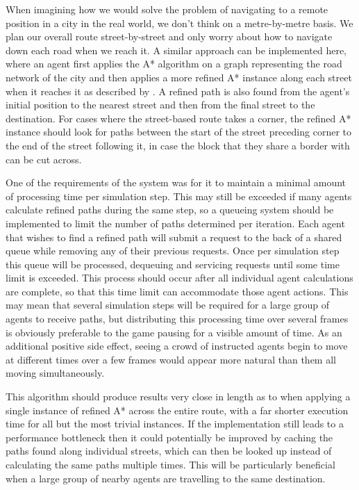 \documentclass[12pt,a4paper]{article}
\begin{document}
When imagining how we would solve the problem of navigating to a remote position in a city in the real world, we don't think on a metre-by-metre basis. We plan our overall route street-by-street and only worry about how to navigate down each road when we reach it. A similar approach can be implemented here, where an agent first applies the A* algorithm on a graph representing the road network of the city and then applies a more refined A* instance along each street when it reaches it as described by  \citeyear{buro05}. A refined path is also found from the agent's initial position to the nearest street and then from the final street to the destination. For cases where the street-based route takes a corner, the refined A* instance should look for paths between the start of the street preceding corner to the end of the street following it, in case the block that they share a border with can be cut across.

One of the requirements of the system was for it to maintain a minimal amount of processing time per simulation step. This may still be exceeded if many agents calculate refined paths during the same step, so a queueing system should be implemented to limit the number of paths determined per iteration. Each agent that wishes to find a refined path will submit a request to the back of a shared queue while removing any of their previous requests. Once per simulation step this queue will be processed, dequeuing and servicing requests until some time limit is exceeded. This process should occur after all individual agent calculations are complete, so that this time limit can accommodate those agent actions. This may mean that several simulation steps will be required for a large group of agents to receive paths, but distributing this processing time over several frames is obviously preferable to the game pausing for a visible amount of time. As an additional positive side effect, seeing a crowd of instructed agents begin to move at different times over a few frames would appear more natural than them all moving simultaneously.

This algorithm should produce results very close in length as to when applying a single instance of refined A* across the entire route, with a far shorter execution time for all but the most trivial instances. If the implementation still leads to a performance bottleneck then it could potentially be improved by caching the paths found along individual streets, which can then be looked up instead of calculating the same paths multiple times. This will be particularly beneficial when a large group of nearby agents are travelling to the same destination.
\end{document}
